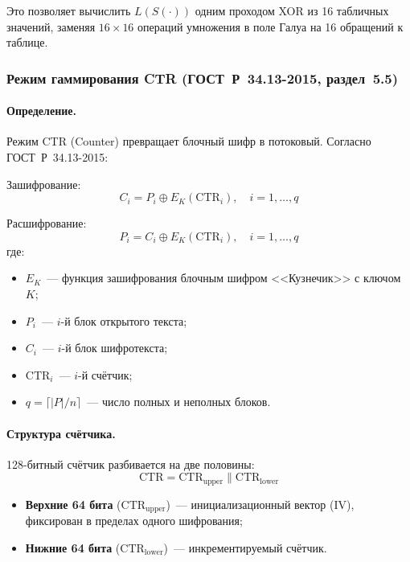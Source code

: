 \documentclass[a4paper,14pt]{extarticle}
\begin{document}
Это позволяет вычислить $L(S(\cdot))$ одним проходом XOR из 16 табличных значений, заменяя $16 \times 16$ операций умножения в поле Галуа на 16 обращений к таблице.

\subsubsection{Режим гаммирования CTR (ГОСТ~Р~34.13-2015, раздел~5.5)}

\paragraph{Определение.}

Режим CTR (Counter) превращает блочный шифр в потоковый. Согласно ГОСТ~Р~34.13-2015:

Зашифрование:
\begin{equation}
    C_i = P_i \oplus E_K(\mathrm{CTR}_i), \quad i = 1, \ldots, q
\end{equation}

Расшифрование:
\begin{equation}
    P_i = C_i \oplus E_K(\mathrm{CTR}_i), \quad i = 1, \ldots, q
\end{equation}
где:
\begin{itemize}
    \item $E_K$~--- функция зашифрования блочным шифром <<Кузнечик>> с ключом $K$;
    \item $P_i$~--- $i$-й блок открытого текста;
    \item $C_i$~--- $i$-й блок шифротекста;
    \item $\mathrm{CTR}_i$~--- $i$-й счётчик;
    \item $q = \lceil |P| / n \rceil$~--- число полных и неполных блоков.
\end{itemize}

\paragraph{Структура счётчика.}

128-битный счётчик разбивается на две половины:
\begin{equation}
    \mathrm{CTR} = \mathrm{CTR}_{\mathrm{upper}} \| \mathrm{CTR}_{\mathrm{lower}}
\end{equation}

\begin{itemize}
    \item \textbf{Верхние 64 бита} ($\mathrm{CTR}_{\mathrm{upper}}$)~--- инициализационный вектор (IV), фиксирован в пределах одного шифрования;
    \item \textbf{Нижние 64 бита} ($\mathrm{CTR}_{\mathrm{lower}}$)~--- инкрементируемый счётчик.
\end{itemize}
\end{document}
